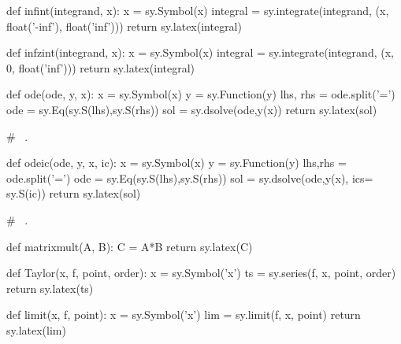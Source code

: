 \begin{pycode}
def infint(integrand, x): 
    x = sy.Symbol(x) 
    integral = sy.integrate(integrand, (x, float('-inf'), float('inf'))) 
    return sy.latex(integral) 

def infzint(integrand, x): 
    x = sy.Symbol(x) 
    integral = sy.integrate(integrand, (x, 0, float('inf'))) 
    return sy.latex(integral) 

def ode(ode, y, x): 
    x = sy.Symbol(x) 
    y = sy.Function(y) 
    lhs, rhs = ode.split('=') 
    ode = sy.Eq(sy.S(lhs),sy.S(rhs)) 
    sol = sy.dsolve(ode,y(x)) 
    return sy.latex(sol) 

#  ~.
 
def odeic(ode, y, x, ic): 
    x  = sy.Symbol(x) 
    y  = sy.Function(y) 
    lhs,rhs = ode.split('=') 
    ode = sy.Eq(sy.S(lhs),sy.S(rhs)) 
    sol = sy.dsolve(ode,y(x), ics= sy.S(ic)) 
    return sy.latex(sol) 

# ~.

def matrixmult(A, B):
    C = A*B
    return sy.latex(C)

def Taylor(x, f, point, order):
    x = sy.Symbol('x')
    ts = sy.series(f, x, point, order) 
    return sy.latex(ts)

def limit(x, f, point):
    x = sy.Symbol('x')
    lim = sy.limit(f, x, point) 
    return sy.latex(lim)

\end{pycode}